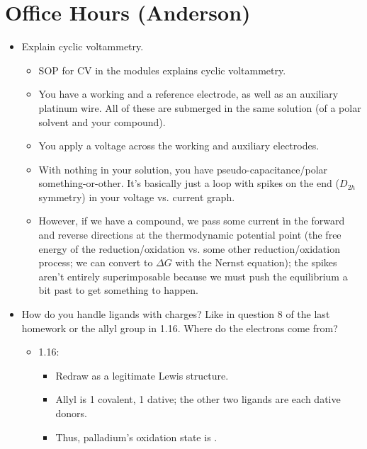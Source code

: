 \documentclass[../notes.tex]{subfiles}
\begin{document}
\section{Office Hours (Anderson)}
\begin{itemize}
    \item Explain cyclic voltammetry.
    \begin{itemize}
        \item SOP for CV in the modules explains cyclic voltammetry.
        \item You have a working and a reference electrode, as well as an auxiliary platinum wire. All of these are submerged in the same solution (of a polar solvent and your compound).
        \item You apply a voltage across the working and auxiliary electrodes.
        \item With nothing in your solution, you have pseudo-capacitance/polar something-or-other. It's basically just a loop with spikes on the end ($D_{2h}$ symmetry) in your voltage vs. current graph.
        \item However, if we have a compound, we pass some current in the forward and reverse directions at the thermodynamic potential point (the free energy of the reduction/oxidation vs. some other reduction/oxidation process; we can convert to $\Delta G$ with the Nernst equation); the spikes aren't entirely superimposable because we must push the equilibrium a bit past to get something to happen.
    \end{itemize}
    \item How do you handle ligands with charges? Like  in question 8 of the last homework or the allyl group in 1.16. Where do the electrons come from?
    \begin{itemize}
        \item 1.16:
        \begin{itemize}
            \item Redraw as a legitimate Lewis structure.
            \begin{center}
                \chemleft{[}
                \chemright{]^+}
            \end{center}
            \item Allyl is 1 covalent, 1 dative; the other two ligands are each dative donors.
            \item Thus, palladium's oxidation state is .

\end{itemize}
\end{itemize}
\end{itemize}
\end{document}
